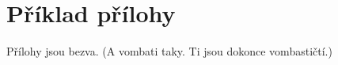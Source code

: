 \chapter{Příklad přílohy}
\label{app:example}

Přílohy jsou bezva. (A vombati taky. Ti jsou dokonce vombastičtí.)